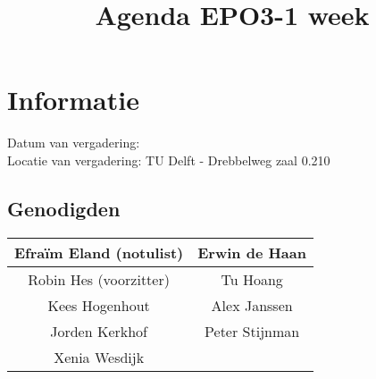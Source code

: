 \documentclass{article}
\begin{document}
\title{Agenda EPO3-1 week }%
\author{}%
\maketitle

\section*{Informatie}
Datum van vergadering: \\ %
Locatie van vergadering: TU Delft - Drebbelweg zaal 0.210 %
\subsection*{Genodigden}
\begin{center}
\begin{tabular}{|c |c |}
	\hline
	Efraïm Eland (notulist) & Erwin de Haan \\
	\hline
	Robin Hes (voorzitter) & Tu Hoang \\
	\hline
	Kees Hogenhout & Alex Janssen\\
	\hline
	Jorden Kerkhof & Peter Stijnman \\
	\hline
	Xenia Wesdijk & \\
	\hline
\end{tabular}
\end{center}
\end{document}
